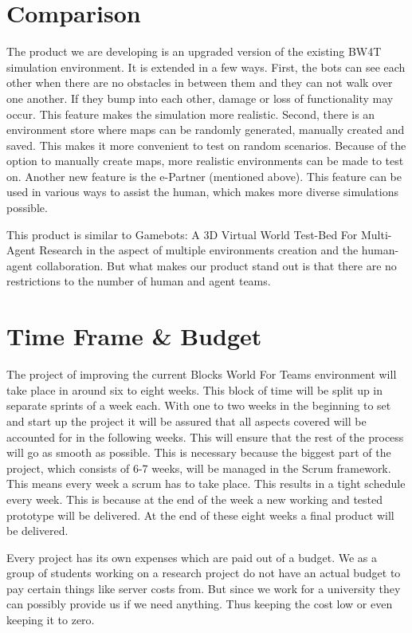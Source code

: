 \documentclass[oneside]{tudelft-report}
\begin{document}
\chapter{Comparison}
The product we are developing is an upgraded version of the existing BW4T simulation environment. It is extended in a few ways. First, the bots can see each other when there are no obstacles in between them and they can not walk over one another. If they bump into each other, damage or loss of functionality may occur. This feature makes the simulation more realistic. Second, there is an environment store where maps can be randomly generated, manually created and saved. This makes it more convenient to test on random scenarios. Because of the option to manually create maps, more realistic environments can be made to test on. Another new feature is the e-Partner (mentioned above). This feature can be used in various ways to assist the human, which makes more diverse simulations possible.

This product is similar to Gamebots: A 3D Virtual World Test-Bed For Multi-Agent Research \cite{adobbati2001gamebots} in the aspect of multiple environments creation and the human-agent collaboration. But what makes our product stand out is that there are no restrictions to the number of human and agent teams.

\chapter{Time Frame \& Budget}
The project of improving the current Blocks World For Teams environment will take place in around six to eight weeks. This block of time will be split up in separate sprints of a week each. With one to two weeks in the beginning to set and start up the project it will be assured that all aspects covered will be accounted for in the following weeks. This will ensure that the rest of the process will go as smooth as possible. This is necessary because the biggest part of the project, which consists of 6-7 weeks, will be managed in the Scrum framework. This means every week a scrum has to take place. This results in a tight schedule every week. This is because at the end of the week a new working and tested prototype will be delivered. At the end of these eight weeks a final product will be delivered.

Every project has its own expenses which are paid out of a budget. We as a group of students working on a research project do not have an actual budget to pay certain things like server costs from. But since we work for a university they can possibly provide us if we need anything. Thus keeping the cost low or even keeping it to zero.




\clearpage


\end{document}
